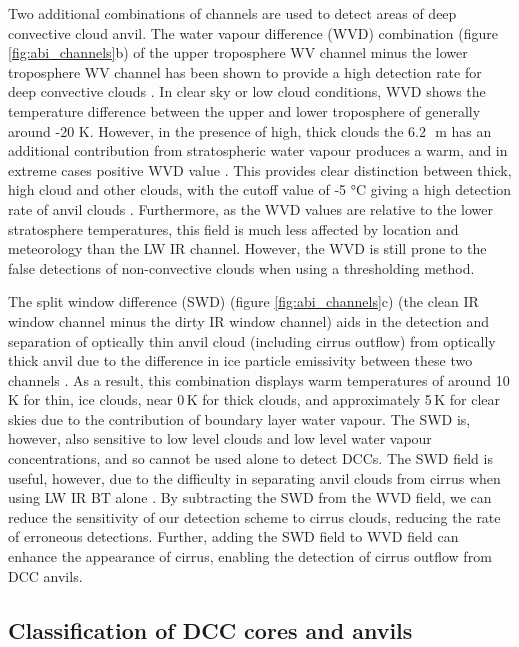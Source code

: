 Two additional combinations of channels are used to detect areas of deep convective cloud anvil. 
The water vapour difference (WVD) combination (figure \ref{fig:abi_channels}b) of the upper troposphere WV channel minus the lower troposphere WV channel has been shown to provide a high detection rate for deep convective clouds \citep{muller_role_2018, muller_novel_2019}.
In clear sky or low cloud conditions, WVD shows the temperature difference between the upper and lower troposphere of generally around -20 K. 
However, in the presence of high, thick clouds the 6.2\,\unit{\mu m} has an additional contribution from stratospheric water vapour produces a warm, and in extreme cases positive WVD value \citep{schmetz_monitoring_1997}.
This provides clear distinction between thick, high cloud and other clouds, with the cutoff value of -5 °C giving a high detection rate of anvil clouds \citep{muller_novel_2019}. 
Furthermore, as the WVD values are relative to the lower stratosphere temperatures, this field is much less affected by location and meteorology than the LW IR channel.
However, the WVD is still prone to the false detections of non-convective clouds when using a thresholding method.

The split window difference (SWD) (figure \ref{fig:abi_channels}c) (the clean IR window channel minus the dirty IR window channel) aids in the detection and separation of optically thin anvil cloud (including cirrus outflow) from optically thick anvil due to the difference in ice particle emissivity between these two channels \citep{heidinger_gazing_2009}.
As a result, this combination displays warm temperatures of around 10\,\unit{K} for thin, ice clouds, near 0\,\unit{K} for thick clouds, and approximately 5\,\unit{K} for clear skies due to the contribution of boundary layer water vapour.
The SWD is, however, also sensitive to low level clouds and low level water vapour concentrations, and so cannot be used alone to detect DCCs.
The SWD field is useful, however, due to the difficulty in separating anvil clouds from cirrus when using LW IR BT alone \citep{hong_detection_2005}. 
By subtracting the SWD from the WVD field, we can reduce the sensitivity of our detection scheme to cirrus clouds, reducing the rate of erroneous detections.
Further, adding the SWD field to WVD field can enhance the appearance of cirrus, enabling the detection of cirrus outflow  from DCC anvils.

\subsection{Classification of DCC cores and anvils}

